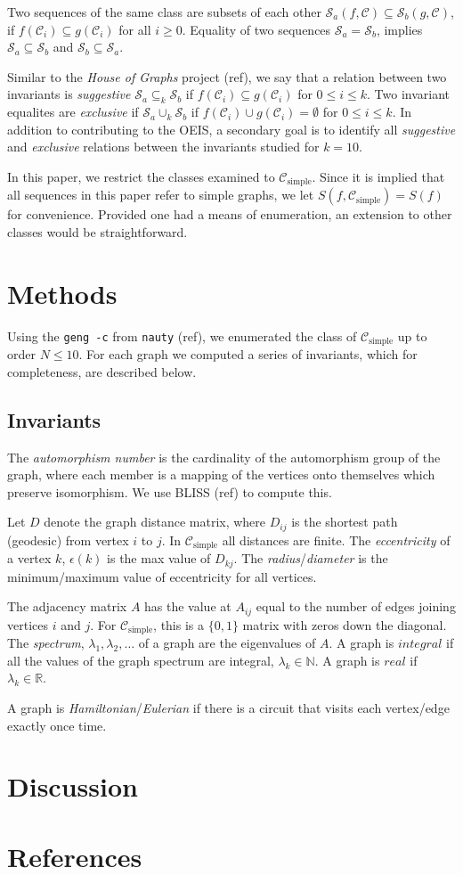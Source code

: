 \documentclass[12pt]{article}
\newcommand{\SEQ}{\mathcal{S}}
\newcommand{\CLASS}{\mathcal{C}}
\newcommand{\SIMPLECLASS}{\mathcal{C}_\text{simple}}
\begin{document}
Two sequences of the same class are subsets of each other $\SEQ_a(f,\CLASS) \subseteq \SEQ_b(g, \CLASS)$, if $f(\CLASS_i) \subseteq g(\CLASS_i)$ for all $i\ge0$.
Equality of two sequences $\SEQ_a = \SEQ_b$, implies $\SEQ_a \subseteq \SEQ_b$ and $\SEQ_b \subseteq \SEQ_a$. 

Similar to the \textit{House of Graphs} project (ref), we say that a relation between two invariants is \textit{suggestive} $\SEQ_a \subseteq_k \SEQ_b$ if $f(\CLASS_i) \subseteq g(\CLASS_i)$ for $0 \le i \le k$.
Two invariant equalites are \textit{exclusive} if $\SEQ_a \cup_k \SEQ_b$ if $f(\CLASS_i) \cup g(\CLASS_i) = \emptyset$ for $0 \le i \le k$.
In addition to contributing to the OEIS, a secondary goal is to identify all \textit{suggestive} and \textit{exclusive} relations between the invariants studied for $k=10$.

In this paper, we restrict the classes examined to $\SIMPLECLASS$.
Since it is implied that all sequences in this paper refer to simple graphs, we let $S(f,\SIMPLECLASS)=S(f)$ for convenience.
Provided one had a means of enumeration, an extension to other classes would be straightforward.


\section{Methods}
Using the \texttt{geng -c} from \texttt{nauty} (ref), we enumerated the class of $\SIMPLECLASS$ up to order $N \le 10$.
For each graph we computed a series of invariants, which for completeness, are described below.

\subsection{Invariants}

The \textit{automorphism number} is the cardinality of the automorphism group of the graph, where each member is a mapping of the vertices onto themselves which preserve isomorphism. We use BLISS (ref) to compute this.

Let $D$ denote the graph distance matrix, where $D_{ij}$ is the shortest path (geodesic) from vertex $i$ to $j$.
In $\SIMPLECLASS$ all distances are finite.
The \textit{eccentricity} of a vertex $k$, $\epsilon(k)$ is the max value of $D_{k j}$.
The \textit{radius}/\textit{diameter} is the minimum/maximum value of eccentricity for all vertices.

The adjacency matrix $A$ has the value at $A_{ij}$ equal to the number of edges joining vertices $i$ and $j$.
For $\SIMPLECLASS$, this is a $\{0,1\}$ matrix with zeros down the diagonal.
The \textit{spectrum}, $\lambda_1, \lambda_2, \ldots$ of a graph are the eigenvalues of $A$.
A graph is $integral$ if all the values of the graph spectrum are integral, $\lambda_k \in \mathbb{N}$.
A graph is $real$ if $\lambda_k \in \mathbb{R}$.

A graph is \textit{Hamiltonian}/\textit{Eulerian} if there is a circuit that visits each vertex/edge exactly once time.

\section{Discussion}


\section{References}
\end{document}
